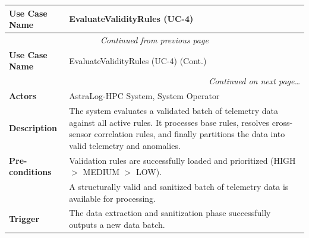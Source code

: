 \documentclass[11pt, a4paper]{article}
\begin{document}
\renewcommand{\arraystretch}{1.6}
\begin{longtable}{|p{3.5cm}|p{10.5cm}|}

\hline
\textbf{Use Case Name} & EvaluateValidityRules (UC-4) \\ \hline
\endfirsthead

\hline
\multicolumn{2}{|c|}{\textit{Continued from previous page}} \\ \hline
\textbf{Use Case Name} & EvaluateValidityRules (UC-4) (Cont.) \\ \hline
\endhead

\hline
\multicolumn{2}{|r|}{\textit{Continued on next page\ldots}} \\ \hline
\endfoot

\hline
\endlastfoot

\textbf{Actors} & AstraLog-HPC System, System Operator \\ \hline

\textbf{Description} &
The system evaluates a validated batch of telemetry data against all active
rules. It processes base rules, resolves cross-sensor correlation rules,
and finally partitions the data into valid telemetry and anomalies. \\ \hline

\textbf{Pre-conditions} &
Validation rules are successfully loaded and prioritized
(HIGH $>$ MEDIUM $>$ LOW). \\
& A structurally valid and sanitized batch of telemetry data is available
for processing. \\ \hline

\textbf{Trigger} &
The data extraction and sanitization phase successfully outputs a new data batch. \\ \hline


\end{longtable}
\end{document}
